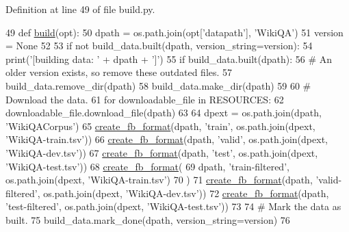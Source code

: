 Definition at line 49 of file build.\+py.


\begin{DoxyCode}
49 \textcolor{keyword}{def }\hyperlink{namespacedialog__babi__feedback_1_1build_a7a9d289f7493a5ded13c4b7f071b6184}{build}(opt):
50     dpath = os.path.join(opt[\textcolor{stringliteral}{'datapath'}], \textcolor{stringliteral}{'WikiQA'})
51     version = \textcolor{keywordtype}{None}
52 
53     \textcolor{keywordflow}{if} \textcolor{keywordflow}{not} build\_data.built(dpath, version\_string=version):
54         print(\textcolor{stringliteral}{'[building data: '} + dpath + \textcolor{stringliteral}{']'})
55         \textcolor{keywordflow}{if} build\_data.built(dpath):
56             \textcolor{comment}{# An older version exists, so remove these outdated files.}
57             build\_data.remove\_dir(dpath)
58         build\_data.make\_dir(dpath)
59 
60         \textcolor{comment}{# Download the data.}
61         \textcolor{keywordflow}{for} downloadable\_file \textcolor{keywordflow}{in} RESOURCES:
62             downloadable\_file.download\_file(dpath)
63 
64         dpext = os.path.join(dpath, \textcolor{stringliteral}{'WikiQACorpus'})
65         \hyperlink{namespaceparlai_1_1tasks_1_1wikiqa_1_1build_a554828702769592403db58c955d1dfe3}{create\_fb\_format}(dpath, \textcolor{stringliteral}{'train'}, os.path.join(dpext, \textcolor{stringliteral}{'WikiQA-train.tsv'}))
66         \hyperlink{namespaceparlai_1_1tasks_1_1wikiqa_1_1build_a554828702769592403db58c955d1dfe3}{create\_fb\_format}(dpath, \textcolor{stringliteral}{'valid'}, os.path.join(dpext, \textcolor{stringliteral}{'WikiQA-dev.tsv'}))
67         \hyperlink{namespaceparlai_1_1tasks_1_1wikiqa_1_1build_a554828702769592403db58c955d1dfe3}{create\_fb\_format}(dpath, \textcolor{stringliteral}{'test'}, os.path.join(dpext, \textcolor{stringliteral}{'WikiQA-test.tsv'}))
68         \hyperlink{namespaceparlai_1_1tasks_1_1wikiqa_1_1build_a554828702769592403db58c955d1dfe3}{create\_fb\_format}(
69             dpath, \textcolor{stringliteral}{'train-filtered'}, os.path.join(dpext, \textcolor{stringliteral}{'WikiQA-train.tsv'})
70         )
71         \hyperlink{namespaceparlai_1_1tasks_1_1wikiqa_1_1build_a554828702769592403db58c955d1dfe3}{create\_fb\_format}(dpath, \textcolor{stringliteral}{'valid-filtered'}, os.path.join(dpext, \textcolor{stringliteral}{'WikiQA-dev.tsv'}))
72         \hyperlink{namespaceparlai_1_1tasks_1_1wikiqa_1_1build_a554828702769592403db58c955d1dfe3}{create\_fb\_format}(dpath, \textcolor{stringliteral}{'test-filtered'}, os.path.join(dpext, \textcolor{stringliteral}{'WikiQA-test.tsv'}))
73 
74         \textcolor{comment}{# Mark the data as built.}
75         build\_data.mark\_done(dpath, version\_string=version)
76 \end{DoxyCode}
\mbox{\label{namespaceparlai_1_1tasks_1_1wikiqa_1_1build_a554828702769592403db58c955d1dfe3}} 

